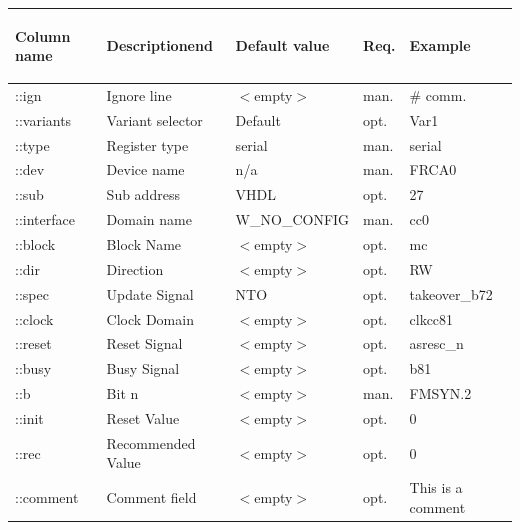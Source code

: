 \documentclass[a4paper,12pt]{report}
\begin{document}
\begin{table}[htb]\begin{tabular}{|l|p{4cm}|p{4cm}|p{15mm}|p{25mm}|}\hline
\begin{bf}Column name\end{bf} & \begin{bf}Descriptionend\end{bf} & \begin{bf}Default value\end{bf} & \begin{bf}Req.\end{bf} & \begin{bf}Example\end{bf}\\\hline
::ign & Ignore line & $<$empty$>$ & man. & \# comm. \\\hline
::variants & Variant selector & Default & opt. & Var1 \\\hline
::type & Register type & serial & man. & serial \\\hline
::dev & Device name & n/a & man. & FRCA0 \\\hline
::sub & Sub address & VHDL & opt. & 27 \\\hline
::interface & Domain name & W\_NO\_CONFIG & man. & cc0 \\\hline
::block & Block Name & $<$empty$>$ & opt. & mc \\\hline
::dir & Direction & $<$empty$>$ & opt. & RW \\\hline
::spec & Update Signal & NTO & opt. & takeover\_b72 \\\hline
::clock & Clock Domain & $<$empty$>$ & opt. & clkcc81 \\\hline
::reset & Reset Signal & $<$empty$>$ & opt. & asresc\_n \\\hline
::busy & Busy Signal & $<$empty$>$ & opt. & b81 \\\hline
::b & Bit n & $<$empty$>$ & man. & FMSYN.2 \\\hline
::init & Reset Value & $<$empty$>$ & opt. & 0 \\\hline
::rec & Recommended Value & $<$empty$>$ & opt. & 0 \\\hline
::comment & Comment field & $<$empty$>$ & opt. & This is a comment \\\hline
\end{tabular}\end{table}
\end{document}
